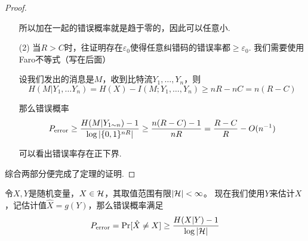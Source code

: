 \begin{proof}
\begin{enumerate}
        所以加在一起的错误概率就是趋于零的，因此可以任意小. 

        \item[(2)] 当$R > C$时，往证明存在$\varepsilon_0$使得任意纠错码的错误率都$\ge \varepsilon_0$. 我们需要使用Faro不等式（写在后面）
        
        设我们发出的消息是$M$，收到比特流$Y_1,\dots, Y_n$，则 
        \[
        H(M|Y_1,\dots Y_n) = H(X) - I(M;Y_1,\dots, Y_n) \ge nR - nC = n(R-C)
        \] 

        那么错误概率
        \[
        P_{\text{error}} \ge \dfrac{H(M|Y_{1\sim n}) - 1}{\log \left\vert\{0,1\}^{nR}\right\vert} \ge \dfrac{n(R-C) - 1}{nR} = \dfrac{R-C}{R} - O(n^{-1})
        \]

        可以看出错误率存在正下界. 
    \end{enumerate}

    综合两部分便完成了定理的证明.
\end{proof}

\begin{theorem}[Faro不等式]
    令$X,Y$是随机变量，$X \in \cal{H}$，其取值范围有限$\left\vert\cal{H}\right\vert < \infty$。 现在我们使用$Y$来估计$X$，记估计值$\hat{X} = g(Y)$，那么错误概率满足 
    \[
    P_{\text{error}} = \Pr[\hat{X} \neq X] \ge \dfrac{H(X|Y) - 1}{\log \left\vert\cal{H}\right\vert}
    \]
\end{theorem}
